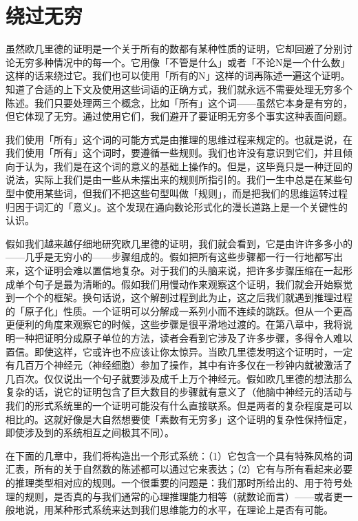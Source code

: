 \documentclass[
  12pt,
  twoside,
  openright,
  oldfontcommands,
]{memoir}
\begin{document}
\section{绕过无穷}

虽然欧几里德的证明是一个关于所有的数都有某种性质的证明，它却回避了分别讨论无穷多种情况中的每一个。它用像「不管是什么」或者「不论N是一个什么数」这样的话来绕过它。我们也可以使用「所有的N」这样的词再陈述一遍这个证明。知道了合适的上下文及使用这些词语的正确方式，我们就永远不需要处理无穷多个陈述。我们只要处理两三个概念，比如「所有」这个词------虽然它本身是有穷的，但它体现了无穷。通过使用它们，我们避开了要证明无穷多个事实这种表面问题。

我们使用「所有」这个词的可能方式是由推理的思维过程来规定的。也就是说，在我们使用「所有」这个词时，要遵循一些规则。我们也许没有意识到它们，并且倾向于认为，我们是在这个词的意义的基础上操作的。但是，这毕竟只是一种迂回的说法，实际上我们是由一些从未摆出来的规则所指引的。我们一生中总是在某些句型中使用某些词，但我们不把这些句型叫做「规则」，而是把我们的思维运转过程归因于词汇的「意义」。这个发现在通向数论形式化的漫长道路上是一个关键性的认识。

假如我们越来越仔细地研究欧几里德的证明，我们就会看到，它是由许许多多小的------几乎是无穷小的------步骤组成的。假如把所有这些步骤都一行一行地都写出来，这个证明会难以置信地复杂。对于我们的头脑来说，把许多步骤压缩在一起形成单个句子是最为清晰的。假如我们用慢动作来观察这个证明，我们就会开始察觉到一个个的框架。换句话说，这个解剖过程到此为止，这之后我们就遇到推理过程的「原子化」性质。一个证明可以分解成一系列小而不连续的跳跃。但从一个更高更便利的角度来观察它的时候，这些步骤是很平滑地过渡的。在第八章中，我将说明一种把证明分成原子单位的方法，读者会看到它涉及了许多步骤，多得令人难以置信。即使这样，它或许也不应该让你太惊异。当欧几里德发明这个证明时，一定有几百万个神经元（神经细胞）参加了操作，其中有许多仅在一秒钟内就被激活了几百次。仅仅说出一个句子就要涉及成千上万个神经元。假如欧几里德的想法那么复杂的话，说它的证明包含了巨大数目的步骤就有意义了（他脑中神经元的活动与我们的形式系统里的一个证明可能没有什么直接联系。但是两者的复杂程度是可以相比的。这就好像是大自然想要使「素数有无穷多」这个证明的复杂性保持恒定，即使涉及到的系统相互之间极其不同）。

在下面的几章中，我们将构造出一个形式系统：（1）它包含一个具有特殊风格的词汇表，所有的关于自然数的陈述都可以通过它来表达；（2）它有与所有看起来必要的推理类型相对应的规则。一个很重要的问题是：我们那时所给出的、用于符号处理的规则，是否真的与我们通常的心理推理能力相等（就数论而言）------或者更一般地说，用某种形式系统来达到我们思维能力的水平，在理论上是否有可能。
\end{document}
